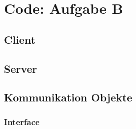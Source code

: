 \documentclass[10pt]{article}
\let\stdsection\section
\renewcommand{\section}{\newpage\stdsection}
\begin{document}
\section{Code: Aufgabe B}
\subsection{Client}


\subsection{Server}




\subsection{Kommunikation Objekte}
\subsubsection{Interface}


\end{document}
